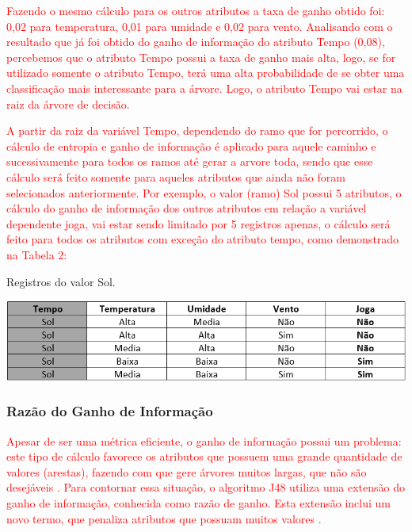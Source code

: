 \par
\textcolor{red}{Fazendo o mesmo cálculo para os outros atributos a taxa de ganho obtido foi: 0,02 para temperatura, 0,01 para umidade e 0,02 para vento. Analisando com o resultado que já foi obtido do ganho de informação do atributo Tempo (0,08), percebemos que o atributo Tempo possui a taxa de ganho mais alta, logo, se for utilizado somente o atributo Tempo, terá uma alta probabilidade de se obter uma classificação mais interessante para a árvore. Logo, o atributo Tempo vai estar na raiz da árvore de decisão.}

\par
\textcolor{red}{A partir da raiz da variável Tempo, dependendo do ramo que for percorrido, o cálculo de entropia e ganho de informação é aplicado para aquele caminho e sucessivamente para todos os ramos até gerar a arvore toda, sendo que esse cálculo será feito somente para aqueles atributos que ainda não foram selecionados anteriormente. Por exemplo, o valor (ramo) Sol possui 5 atributos, o cálculo do ganho de informação dos outros atributos em relação a variável dependente joga, vai estar sendo limitado por 5 registros apenas, o cálculo será feito para todos os atributos com exceção do atributo tempo, como demonstrado na Tabela 2:}

\par
\begin{table}[!htp]
	\begin{center}
    \caption{\label{fig:waveform_fig} Registros do valor Sol.}
	\includegraphics[scale=0.70]{Figuras/Ramo_sol.png}
	\end{center}
\end{table}

\subsubsection{Razão do Ganho de Informação}

\par
\textcolor{red}{Apesar de ser uma métrica eficiente, o ganho de informação possui um problema: este tipo de cálculo favorece os atributos que possuem uma grande quantidade de valores (arestas), fazendo com que gere árvores muitos largas, que não são desejáveis \cite{Garcia2003}. Para contornar essa situação, o algoritmo J48 utiliza uma extensão do ganho de informação, conhecida como razão de ganho. Esta extensão inclui um novo termo, que penaliza atributos que possuam muitos valores \cite{Carvalho2014}.}

